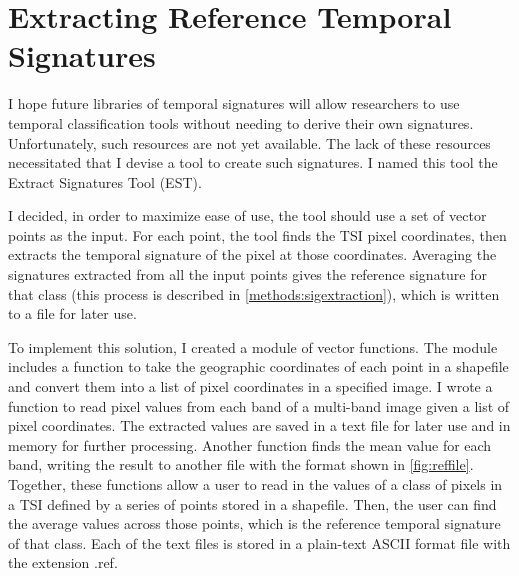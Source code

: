 \section{Extracting Reference Temporal Signatures}
\label{appendix:tools:extract}

I hope future libraries of temporal signatures will allow researchers to use temporal classification tools without needing to derive their own signatures. Unfortunately, such resources are not yet available. The lack of these resources necessitated that I devise a tool to create such signatures. I named this tool the Extract Signatures Tool (EST).

I decided, in order to maximize ease of use, the tool should use a set of vector points as the input. For each point, the tool finds the TSI pixel coordinates, then extracts the temporal signature of the pixel at those coordinates. Averaging the signatures extracted from all the input points gives the reference signature for that class (this process is described in \autoref{methods:sigextraction}), which is written to a file for later use.

To implement this solution, I created a module of vector functions. The module includes a function to take the geographic coordinates of each point in a shapefile and convert them into a list of pixel coordinates in a specified image. I wrote a function to read pixel values from each band of a multi-band image given a list of pixel coordinates. The extracted values are saved in a text file for later use and in memory for further processing. Another function finds the mean value for each band, writing the result to another file with the format shown in \autoref{fig:reffile}. Together, these functions allow a user to read in the values of a class of pixels in a TSI defined by a series of points stored in a shapefile. Then, the user can find the average values across those points, which is the reference temporal signature of that class. Each of the text files is stored in a plain-text ASCII format file with the extension .ref.

